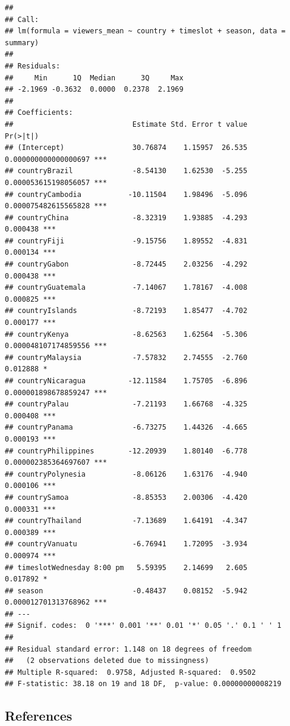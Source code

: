 \documentclass[
  b5paper]{book}
\begin{document}
\begin{verbatim}
## 
## Call:
## lm(formula = viewers_mean ~ country + timeslot + season, data = summary)
## 
## Residuals:
##     Min      1Q  Median      3Q     Max 
## -2.1969 -0.3632  0.0000  0.2378  2.1969 
## 
## Coefficients:
##                            Estimate Std. Error t value             Pr(>|t|)    
## (Intercept)                30.76874    1.15957  26.535 0.000000000000000697 ***
## countryBrazil              -8.54130    1.62530  -5.255 0.000053615198056057 ***
## countryCambodia           -10.11504    1.98496  -5.096 0.000075482615565828 ***
## countryChina               -8.32319    1.93885  -4.293             0.000438 ***
## countryFiji                -9.15756    1.89552  -4.831             0.000134 ***
## countryGabon               -8.72445    2.03256  -4.292             0.000438 ***
## countryGuatemala           -7.14067    1.78167  -4.008             0.000825 ***
## countryIslands             -8.72193    1.85477  -4.702             0.000177 ***
## countryKenya               -8.62563    1.62564  -5.306 0.000048107174859556 ***
## countryMalaysia            -7.57832    2.74555  -2.760             0.012888 *  
## countryNicaragua          -12.11584    1.75705  -6.896 0.000001898678859247 ***
## countryPalau               -7.21193    1.66768  -4.325             0.000408 ***
## countryPanama              -6.73275    1.44326  -4.665             0.000193 ***
## countryPhilippines        -12.20939    1.80140  -6.778 0.000002385364697607 ***
## countryPolynesia           -8.06126    1.63176  -4.940             0.000106 ***
## countrySamoa               -8.85353    2.00306  -4.420             0.000331 ***
## countryThailand            -7.13689    1.64191  -4.347             0.000389 ***
## countryVanuatu             -6.76941    1.72095  -3.934             0.000974 ***
## timeslotWednesday 8:00 pm   5.59395    2.14699   2.605             0.017892 *  
## season                     -0.48437    0.08152  -5.942 0.000012701313768962 ***
## ---
## Signif. codes:  0 '***' 0.001 '**' 0.01 '*' 0.05 '.' 0.1 ' ' 1
## 
## Residual standard error: 1.148 on 18 degrees of freedom
##   (2 observations deleted due to missingness)
## Multiple R-squared:  0.9758, Adjusted R-squared:  0.9502 
## F-statistic: 38.18 on 19 and 18 DF,  p-value: 0.00000000008219
\end{verbatim}

\hypertarget{references-3}{%
\subsection*{References}\label{references-3}}
\end{document}
